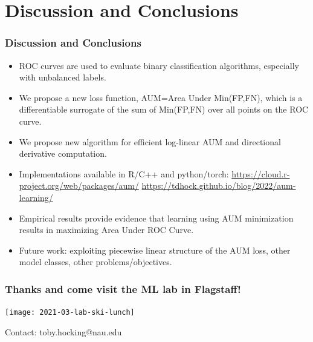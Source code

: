 \documentclass[t]{beamer}
\begin{document}
\section{Discussion and Conclusions}

\begin{frame}
  \frametitle{Discussion and Conclusions}
  \begin{itemize}
  \item ROC curves are used to evaluate binary classification
    algorithms, especially with unbalanced labels.  
  \item We propose a new loss function, AUM=Area Under Min(FP,FN),
    which is a differentiable surrogate of the sum of Min(FP,FN) over
    all points on the ROC curve.
  \item We propose new algorithm for efficient log-linear AUM and directional
    derivative computation.
  \item Implementations available in R/C++ and python/torch:
    \url{https://cloud.r-project.org/web/packages/aum/}
    \url{https://tdhock.github.io/blog/2022/aum-learning/}
  \item Empirical results provide evidence that learning using AUM
    minimization results in maximizing Area Under ROC Curve.
  \item Future work: exploiting piecewise linear structure of the AUM
    loss, other model classes, other problems/objectives.
  \end{itemize}
\end{frame}

\begin{frame}
  \frametitle{Thanks and come visit the ML lab in Flagstaff!}

  \texttt{[image: 2021-03-lab-ski-lunch]} 

  Contact: toby.hocking@nau.edu

\end{frame} 
\end{document}
